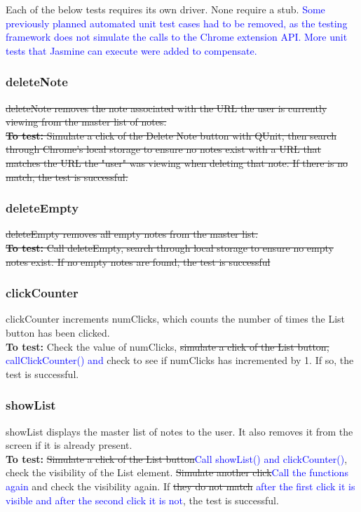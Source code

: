 \documentclass[12pt, titlepage]{article}
\begin{document}
Each of the below tests requires its own driver. None require a stub.
\textcolor{blue}{Some previously planned automated unit test cases had to be 
removed, as the testing framework does not simulate the calls to the Chrome 
extension API. More unit tests that Jasmine can execute were added to 
compensate.}

\subsubsection{deleteNote}
	\sout{deleteNote removes the note associated with the URL the user is 
	currently 
	viewing from the master list of notes.\\
	\textbf{To test:} Simulate a click of the Delete Note button with QUnit, 
	then search through Chrome's local storage to ensure no notes exist with a 
	URL that matches the URL the "user" was viewing when deleting that note. If 
	there is no match, the test is successful.}
\subsubsection{deleteEmpty}
	\sout{deleteEmpty removes all empty notes from the master list.\\
	\textbf{To test:} Call deleteEmpty, search through local storage to ensure 
	no empty notes exist. If no empty notes are found, the test is successful}
\subsubsection{clickCounter}
	clickCounter increments numClicks, which counts the number of times the 
	List button has been clicked.\\
	\textbf{To test:} Check the value of numClicks, \sout{simulate a click of 
	the 
	List button, }\textcolor{blue}{callClickCounter() and}
	check to see if numClicks has incremented by 1. If so, the test is 
	successful.
\subsubsection{showList}
	showList displays the master list of notes to the user. It also removes it 
	from the screen if it is already present.\\
	\textbf{To test:} \sout{Simulate a click of the List 
	button}\textcolor{blue}{Call showList() and clickCounter()}, check the 
	visibility 
	of the 
	List element. \sout{Simulate another click}\textcolor{blue}{Call the 
	functions again} and check the visibility again. If 
	\sout{they do not match} \textcolor{blue}{after the first click it is 
	visible and after the second click it is not}, the test is successful.
\end{document}
